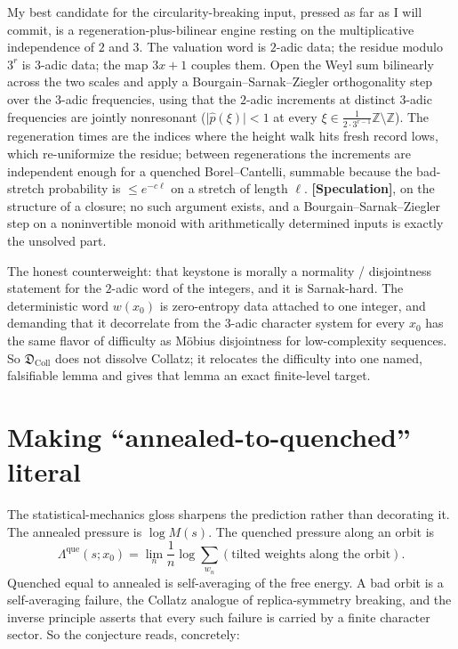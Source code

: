 \documentclass[11pt]{article}
\newcommand{\Z}{\mathbb{Z}}
\newcommand{\Dcoll}{\mathfrak{D}_{\mathrm{Coll}}}
\newcommand{\que}{\mathrm{que}}
\newcommand{\epi}[1]{{\small\sffamily\textbf{[#1]}}}
\theoremstyle{remark}
\begin{document}
My best candidate for the circularity-breaking input, pressed as far as I will commit, is a
regeneration-plus-bilinear engine resting on the multiplicative independence of $2$ and $3$.
The valuation word is $2$-adic data; the residue modulo $3^r$ is $3$-adic data; the map
$3x+1$ couples them. Open the Weyl sum bilinearly across the two scales and apply a
Bourgain--Sarnak--Ziegler orthogonality step over the $3$-adic frequencies, using that the
$2$-adic increments at distinct $3$-adic frequencies are jointly nonresonant
($\lvert\hat p(\xi)\rvert < 1$ at every $\xi\in\frac{1}{2\cdot 3^{r-1}}\Z\setminus\Z$). The
regeneration times are the indices where the height walk hits fresh record lows, which
re-uniformize the residue; between regenerations the increments are independent enough for a
quenched Borel--Cantelli, summable because the bad-stretch probability is $\le e^{-c\ell}$
on a stretch of length $\ell$. \epi{Speculation}, on the structure of a closure; no such
argument exists, and a Bourgain--Sarnak--Ziegler step on a noninvertible monoid with
arithmetically determined inputs is exactly the unsolved part.

The honest counterweight: that keystone is morally a normality / disjointness statement for
the $2$-adic word of the integers, and it is Sarnak-hard. The deterministic word $w(x_0)$ is
zero-entropy data attached to one integer, and demanding that it decorrelate from the
$3$-adic character system for every $x_0$ has the same flavor of difficulty as M\"obius
disjointness for low-complexity sequences. So $\Dcoll$ does not dissolve Collatz; it
relocates the difficulty into one named, falsifiable lemma and gives that lemma an exact
finite-level target.

\section{Making ``annealed-to-quenched'' literal}

The statistical-mechanics gloss sharpens the prediction rather than decorating it. The
annealed pressure is $\log M(s)$. The quenched pressure along an orbit is
\[
\Lambda^{\que}(s;x_0) = \lim_{n} \frac1n \log \sum_{w_n} (\text{tilted weights along the orbit}).
\]
Quenched equal to annealed is self-averaging of the free energy. A bad orbit is a
self-averaging failure, the Collatz analogue of replica-symmetry breaking, and the inverse
principle asserts that every such failure is carried by a finite character sector. So the
conjecture reads, concretely:
\end{document}
